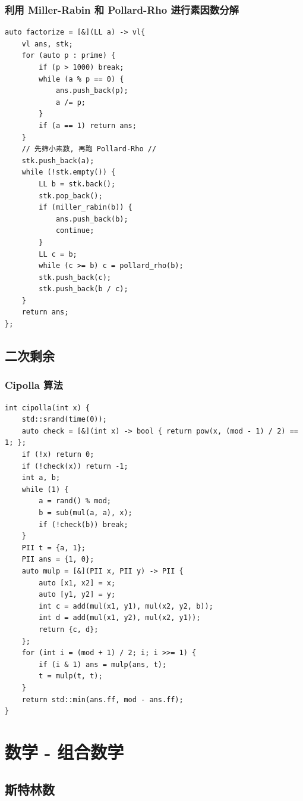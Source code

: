 \documentclass[UTF8, a4paper, titlepage, twoside]{ctexart}
\begin{document}
\subsubsection{ 利用 Miller-Rabin 和 Pollard-Rho 进行素因数分解 }
\begin{lstlisting}
auto factorize = [&](LL a) -> vl{
    vl ans, stk;
    for (auto p : prime) {
        if (p > 1000) break;
        while (a % p == 0) {
            ans.push_back(p);
            a /= p;
        }
        if (a == 1) return ans;
    }
    // 先筛小素数, 再跑 Pollard-Rho //
    stk.push_back(a);
    while (!stk.empty()) {
        LL b = stk.back();
        stk.pop_back();
        if (miller_rabin(b)) {
            ans.push_back(b);
            continue;
        }
        LL c = b;
        while (c >= b) c = pollard_rho(b);
        stk.push_back(c);
        stk.push_back(b / c);
    }
    return ans;
};
\end{lstlisting}

\subsection{ 二次剩余 }

\subsubsection{ Cipolla 算法 }
\begin{lstlisting}
int cipolla(int x) {
    std::srand(time(0));
    auto check = [&](int x) -> bool { return pow(x, (mod - 1) / 2) == 1; };
    if (!x) return 0;
    if (!check(x)) return -1;
    int a, b;
    while (1) {
        a = rand() % mod;
        b = sub(mul(a, a), x);
        if (!check(b)) break;
    }
    PII t = {a, 1};
    PII ans = {1, 0};
    auto mulp = [&](PII x, PII y) -> PII {
        auto [x1, x2] = x;
        auto [y1, y2] = y;
        int c = add(mul(x1, y1), mul(x2, y2, b));
        int d = add(mul(x1, y2), mul(x2, y1));
        return {c, d};
    };
    for (int i = (mod + 1) / 2; i; i >>= 1) {
        if (i & 1) ans = mulp(ans, t);
        t = mulp(t, t);
    }
    return std::min(ans.ff, mod - ans.ff);
}
\end{lstlisting}

\section{ 数学 - 组合数学 }
\subsection{ 斯特林数 }
\end{document}
